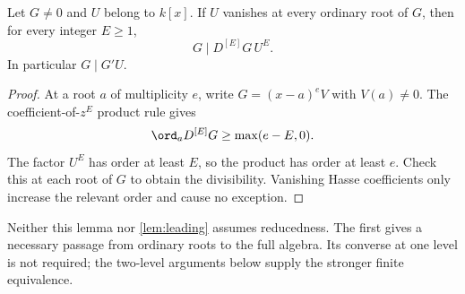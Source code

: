 \begin{lemma}
\label{lem:root-certificates}
Let $G\ne0$ and $U$ belong to $k[x]$. If $U$ vanishes at
every ordinary root of $G$, then for every integer $E\ge1$,
\begin{equation}
 G\mid D^{[E]}G\,U^E.
 \label{eq:hasse-necessary}
\end{equation}
In particular $G\mid G'U$.
\end{lemma}

\begin{proof}
At a root $a$ of multiplicity $e$, write $G=(x-a)^eV$ with
$V(a)\ne0$. The coefficient-of-$z^E$ product rule gives
\[
 \ord_a D^{[E]}G\ge\max(e-E,0).
\]
The factor $U^E$ has order at least $E$, so the product has
order at least $e$. Check this at each root of $G$ to obtain
the divisibility. Vanishing Hasse coefficients only increase
the relevant order and cause no exception.
\end{proof}

Neither this lemma nor \cref{lem:leading} assumes reducedness.
The first gives a necessary passage from ordinary roots to the
full algebra. Its converse at one level is not required; the
two-level arguments below supply the stronger finite equivalence.
